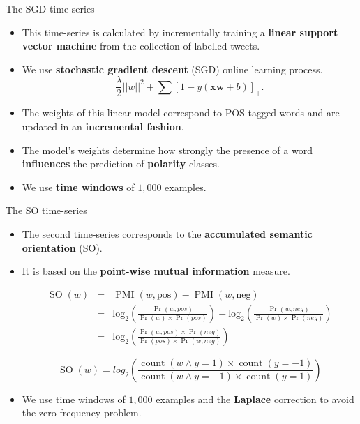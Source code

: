 \documentclass[handout]{beamer}
\begin{document}
\begin{frame}{The SGD time-series }
\begin{scriptsize}
\begin{itemize}
\item  This time-series is calculated by incrementally training a \textbf{linear support vector machine} from the collection of labelled tweets.
\item We use \textbf{stochastic gradient descent} (SGD) online learning process.
\begin{equation}\label{eq:sgd}
\frac{\lambda}{2}||w||^2+\sum [1- y (\mathbf{xw} +b) ]_{+}.
\end{equation}
\item The weights of this linear model correspond to POS-tagged words and are updated in an \textbf{incremental fashion}.
\item  The model's weights determine how strongly the presence of a word \textbf{influences} the prediction of \textbf{polarity} classes.
\item We use \textbf{time windows} of $1,000$ examples.  

\end{itemize}
\end{scriptsize}

\end{frame}


\begin{frame}{The SO time-series }
\begin{scriptsize}
\begin{itemize}
\item  The second time-series corresponds to the \textbf{accumulated semantic orientation} (SO).
\item It is based on the \textbf{point-wise mutual information} measure.

\begin{eqnarray}
 \operatorname{SO}(w) & = & \operatorname{PMI}(w,\text{pos})- \operatorname{PMI}(w,\text{neg}) \\ \nonumber
  & = & \operatorname{log_2} \left( \frac{\Pr(w,pos)}{\Pr(w) \times \Pr(pos)} \right) -  \operatorname{log_2} \left( \frac{\Pr(w,neg)}{\Pr(w) \times \Pr(neg)} \right) \\ \nonumber
 & = & \operatorname{log_2} \left( \frac{\Pr(w,pos)\times \Pr(neg)}{\Pr(pos) \times \Pr(w,neg)} \right)
\end{eqnarray}



\begin{equation}\label{eq:so}
 \operatorname{SO}(w) = log_2 \left( \frac{\operatorname{count}(w \wedge y=1) \times \operatorname{count}(y=-1)}{\operatorname{count}(w\wedge y=-1) \times \operatorname{count}(y=1)}\right)
\end{equation}

\item We use time windows of $1,000$ examples and the \textbf{Laplace} correction to avoid the zero-frequency problem. 


\end{itemize}
\end{scriptsize}

\end{frame}
\end{document}
